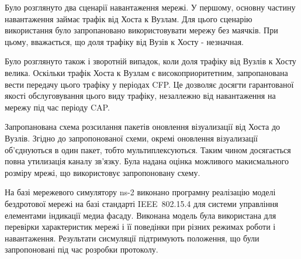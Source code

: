 \documentclass[a4paper,ukrainian,utf8,nocolumnsxix,floatsection,equationsection]{eskdtext}
\newcommand{\iee}[0]{IEEE~802.15.4\xspace}
\begin{document}
Було розглянуто два сценарії навантаження мережі. У першому, основну частину навантаження займає трафік від Хоста к Вузлам. Для цього сценарію використання було запропановано використовувати мережу без маячків. При цьому, вважається, що доля трафіку від Вузів к Хосту - незначная.

Було розглянуто також і зворотній випадок, коли доля трафіку від Вузлів к Хосту велика. Оскільки трафік Хоста к Вузлам є високоприоритетним, запропанована вести передачу цього трафіку у періодах CFP. Це дозволяє досягти гарантованої якості обслуговування цього виду трафіку, незаллежно від навантаження на мережу під час періоду CAP.

Запропанована схема розсилання пакетів оновлення візуализації від Хоста до Вузлів. Згідно до запропонованої схеми, окремі оновлення візуализації об’єднуються в один пакет, тобто мультиплексуються. Таким чином досягається повна утилизація каналу зв’язку. Була надана оцінка можливого макисмального розміру мрежі, що використовує запропоновану схему.

На базі мережевого симулятору ns-2 виконано програмну реалізацію моделі бездротової мережі на базі стандарті \iee для системи управління елементами індикації медиа фасаду. Виконана модель була використана для перевірки характеристик мережі і її поведінки при різних режимах роботи і навантаження. Результати сисмуляції підтримують положення, що були запропоновані під час розробки протоколу.



% 



\end{document}
